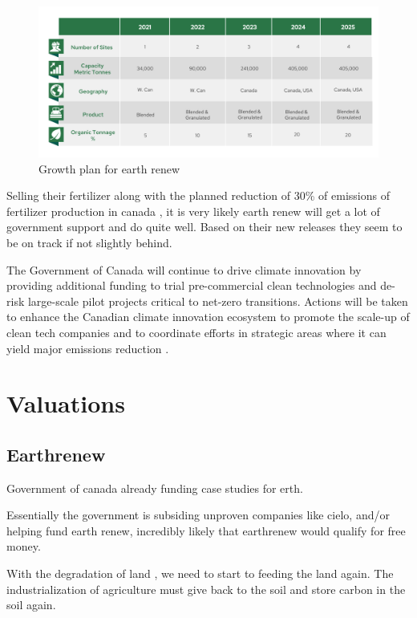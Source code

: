 \begin{figure}[h]
\includegraphics[width=\textwidth]{src/media/63894524-04fe-485b-a801-736431092c3c-e1633360733920.png}
\caption{Growth plan for earth renew}
\end{figure}

Selling their fertilizer along with the planned reduction of 30\% of emissions of fertilizer production in canada \cite{climate_change_2030_emissions}, it is very likely earth renew will get a lot of government support and do quite well. Based on their new releases they seem to be on track if not slightly behind.


\begin{blockquote}
The Government of Canada will continue to drive climate innovation by providing additional funding to
trial pre-commercial clean technologies and de-risk large-scale pilot projects critical to net-zero
transitions. Actions will be taken to enhance the Canadian climate innovation ecosystem to promote the
scale-up of clean tech companies and to coordinate efforts in strategic areas where it can yield major
emissions reduction \cite{climate_change_2030_emissions}. 
\end{blockquote}


\chapter{Valuations}

\section{Earthrenew}
Government of canada already funding case studies for erth.

Essentially the government is subsiding unproven companies like cielo, and/or helping fund earth renew, incredibly likely that earthrenew would qualify for free money.

With the degradation of land \cite{the_guardian_degraded_2022}, we need to start to feeding the land again. The industrialization of agriculture must give back to the soil and store carbon in the soil again.

